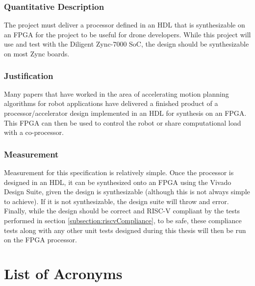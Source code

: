 \documentclass[11pt, oneside]{article}      %
\begin{document}
\subsubsection{Quantitative Description}
The project must deliver a processor defined in an \ac{HDL} that is synthesizable on an FPGA for the project to be useful for drone developers. While this project will use and test with the Diligent Zync-7000 \ac{SoC}\cite{Zync}, the design should be synthesizable on most Zync boards.
\subsubsection{Justification}
Many papers that have worked in the area of accelerating motion planning algorithms for robot applications have delivered a finished product of a processor/accelerator design implemented in an \ac{HDL} for synthesis on an FPGA.\cite{Murray}\cite{Atay2006}\cite{Malik2015} This FPGA can then be used to control the robot or share computational load with a co-processor.
\subsubsection{Measurement}
Measurement for this specification is relatively simple. Once the processor is designed in an \ac{HDL}, it can be synthesized onto an FPGA using the Vivado Design Suite, given the design is synthesizable (although this is not always simple to achieve). If it is not synthesizable, the design suite will throw and error.
Finally, while the design should be correct and RISC-V compliant by the tests performed in section \ref{subsection:riscvCompliance}, to be safe, these compliance tests along with any other unit tests designed during this thesis will then be run on the \ac{FPGA} processor.


\section{List of Acronyms}



\clearpage



\end{document}
